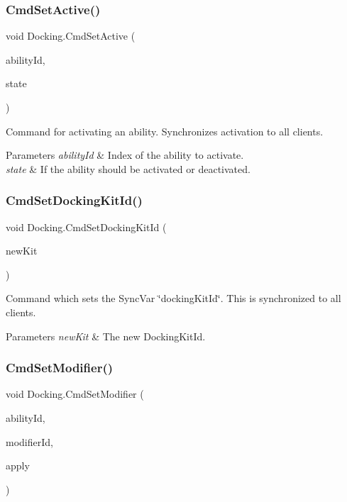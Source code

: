 \subsubsection{\texorpdfstring{Cmd\+Set\+Active()}{CmdSetActive()}}
{\footnotesize\ttfamily void Docking.\+Cmd\+Set\+Active (\begin{DoxyParamCaption}\item[{int}]{ability\+Id,  }\item[{bool}]{state }\end{DoxyParamCaption})}



Command for activating an ability. Synchronizes activation to all clients. 


\begin{DoxyParams}{Parameters}
{\em ability\+Id} & Index of the ability to activate.\\
\hline
{\em state} & If the ability should be activated or deactivated.\\
\hline
\end{DoxyParams}
\hypertarget{class_docking_a44a8510bc605c3195df5e30e4ef9df10}{}\label{class_docking_a44a8510bc605c3195df5e30e4ef9df10} 
\subsubsection{\texorpdfstring{Cmd\+Set\+Docking\+Kit\+Id()}{CmdSetDockingKitId()}}
{\footnotesize\ttfamily void Docking.\+Cmd\+Set\+Docking\+Kit\+Id (\begin{DoxyParamCaption}\item[{Docking\+Kit\+Id}]{new\+Kit }\end{DoxyParamCaption})}



Command which sets the Sync\+Var \char`\"{}docking\+Kit\+Id\char`\"{}. This is synchronized to all clients. 


\begin{DoxyParams}{Parameters}
{\em new\+Kit} & The new Docking\+Kit\+Id.\\
\hline
\end{DoxyParams}
\hypertarget{class_docking_a34f8c9d62c42cb6ab4df7e874e55ca55}{}\label{class_docking_a34f8c9d62c42cb6ab4df7e874e55ca55} 
\subsubsection{\texorpdfstring{Cmd\+Set\+Modifier()}{CmdSetModifier()}}
{\footnotesize\ttfamily void Docking.\+Cmd\+Set\+Modifier (\begin{DoxyParamCaption}\item[{int}]{ability\+Id,  }\item[{int}]{modifier\+Id,  }\item[{bool}]{apply }\end{DoxyParamCaption})}



